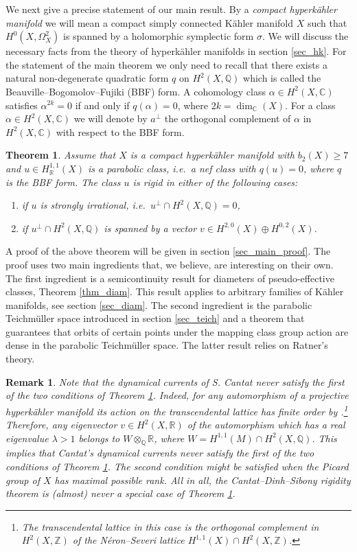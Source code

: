 \documentclass[11pt]{article}
\newcommand{\6}{\partial}
\newcommand{\Q}{\mathbb{Q}}
\newcommand{\R}{\mathbb{R}}
\newcommand{\Z}{\mathbb{Z}}
\newcommand{\bbQ}{\mathbb{Q}}
\newcommand{\bbR}{\mathbb{R}}
\newcommand{\bbC}{\mathbb{C}}
\renewcommand{\ge}{\geqslant}
\newtheorem{thm}[defn]{Theorem}
\newtheorem{rem}[defn]{Remark}
\begin{document}
We next give a precise statement of our main result. By a {\it compact hyperk\"ahler manifold} we
will mean a compact simply connected K\"ahler manifold $X$ such that $H^0(X,\Omega^2_X)$
is spanned by a holomorphic symplectic form $\sigma$. We will discuss the necessary
facts from the theory of hyperk\"ahler manifolds in section \ref{sec_hk}.
For the statement of the main theorem we only need to recall that there
exists a natural non-degenerate quadratic form $q$ on $H^2(X,\bbQ)$
which is called the Beauville--Bogomolov--Fujiki (BBF) form. A cohomology
class $\alpha\in H^2(X,\bbC)$ satisfies $\alpha^{2k} = 0$ if and only
if $q(\alpha)=0$, where $2k = \dim_\bbC(X)$. For a class $\alpha\in H^2(X,\bbC)$
we will denote by $a^\perp$ the orthogonal complement of $\alpha$ in $H^2(X,\bbC)$
with respect to the BBF form.

\begin{thm}\label{thm_main}
Assume that $X$ is a compact hyperk\"ahler manifold with $b_2(X)\ge 7$
and $u\in H^{1,1}_\bbR(X)$ is a parabolic class, i.e.\ a nef class
with $q(u)=0$, where $q$ is the BBF form. The class $u$ is
rigid in  either of the following cases:
\begin{enumerate}
\item if $u$ is strongly irrational, i.e.\ $u^\perp \cap H^2(X,\bbQ) = 0$,
\item if $u^\perp \cap H^2(X,\bbQ)$ is spanned by a vector $v\in H^{2,0}(X)\oplus H^{0,2}(X)$.
\end{enumerate}
\end{thm}

A proof of the above theorem will be given in section \ref{sec_main_proof}.
The proof uses two main ingredients that, we believe, are interesting on their own. The first ingredient is a semicontinuity
result for diameters of pseudo-effective classes, Theorem \ref{thm_diam}.
This result applies to arbitrary families of K\"ahler manifolds, see section \ref{sec_diam}.
The second ingredient is the parabolic Teichm\"uller space introduced in section \ref{sec_teich}
and a theorem that guarantees that orbits of certain points under the
mapping class group action are dense in the parabolic Teichm\"uller space.
The latter result relies on Ratner's theory.

\begin{rem}
Note that the dynamical currents of 
S. Cantat never satisfy the first of the two
conditions of Theorem \ref{thm_main}. Indeed, for
any automorphism of a projective hyperk\"ahler manifold 
its action on the transcendental lattice has finite order
by \cite{_Oguiso:mcmullen_}.\footnote{The transcendental
lattice in this case is the orthogonal complement in $H^2(X, \Z)$ of the N\'eron--Severi lattice $H^{1,1}(X)\cap H^2(X, \Z)$.}
Therefore, any eigenvector $v\in H^2(X, \R)$ of the
automorphism which has a real eigenvalue $\lambda >1$
belongs to $W\otimes_\Q \R$, where $W = H^{1,1}(M)\cap H^2(X, \Q)$.
This implies that Cantat's dynamical
currents never satisfy the first of the two conditions
of Theorem \ref{thm_main}. The second condition might be satisfied
when the Picard group of $X$ has maximal possible rank.
All in all, the Cantat--Dinh--Sibony rigidity theorem is
(almost) never a special case of Theorem \ref{thm_main}. 
\end{rem}
\end{document}

